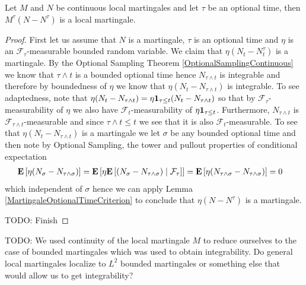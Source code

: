 \begin{lem}Let $M$ and $N$ be continuous local martingales and let $\tau$ be an optional time, then $M^\tau \left( N - N^\tau \right)$ is a local martingale.
\end{lem}
\begin{proof}
First let us assume that $N$ is a martingale, $\tau$ is an optional time and $\eta$ is an $\mathcal{F}_\tau$-measurable bounded random variable.  We claim that $\eta(N_t - N^\tau_t)$ is a martingale.  By the Optional Sampling Theorem \ref{OptionalSamplingContinuous} we know that $\tau \wedge t$ is a bounded optional time hence $N_{\tau \wedge t}$ is integrable and therefore by boundedness of $\eta$ we know that $\eta(N_t - N_{\tau \wedge t})$ is integrable.  To see adaptedness, note that $\eta(N_t - N_{\tau \wedge t}) = \eta \characteristic{\tau \leq t} (N_t - N_{\tau \wedge t})$ so that by $\mathcal{F}_\tau$-measurability of $\eta$ we also have $\mathcal{F}_t$-measurability of $\eta \characteristic{\tau \leq t}$.  Furthermore, $N_{\tau \wedge t}$ is $\mathcal{F}_{\tau \wedge t}$-measurable and since $\tau \wedge t \leq t$ we see that it is also $\mathcal{F}_t$-measurable.  To see that $\eta (N_t - N_{\tau \wedge t})$ is a martingale we let $\sigma$ be any bounded optional time and then note by Optional Sampling, the tower and pullout properties of conditional expectation 
\begin{align*}
\expectation{\eta (N_\sigma - N_{\tau \wedge \sigma})} &= \expectation{\eta \cexpectationlong{\mathcal{F}_\tau}{ (N_\sigma - N_{\tau \wedge \sigma})}} = \expectation{\eta  (N_{\tau \wedge \sigma} - N_{\tau \wedge \sigma})} = 0
\end{align*}
which independent of $\sigma$ hence we can apply Lemma \ref{MartingaleOptionalTimeCriterion} to conclude that $\eta(N - N^\tau)$ is a martingale.

TODO: Finish
\end{proof}

TODO: We used continuity of the local martingale $M$ to reduce ourselves to the case of bounded martingales which was used to obtain integrability.  Do general local martingales localize to $L^2$ bounded martingales or something else that would allow us to get integrability?

